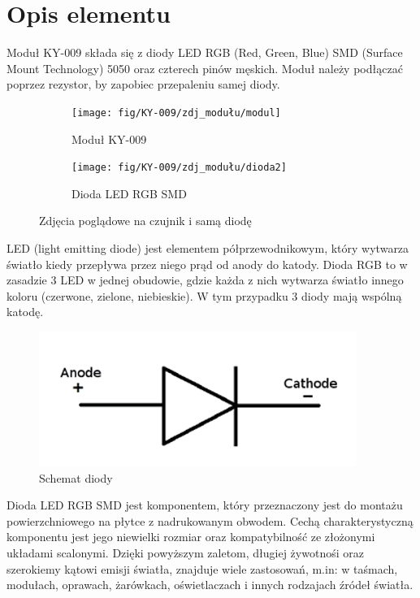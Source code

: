 \documentclass[11pt, a4paper]{article}
\author{Antoni Borowski}
\institute{Instytut Robotyki i Inteligencji Maszynowej}
\begin{document}
\newpage

\section*{Opis elementu} 
Moduł KY-009 składa się z diody LED RGB (Red, Green, Blue) SMD (Surface Mount Technology) 5050 oraz czterech pinów męskich. Moduł należy podłączać poprzez rezystor, by zapobiec przepaleniu samej diody. 

\vspace{0.5cm}
\begin{figure}[h]
\centering
\begin{subfigure}{.5\textwidth}
  \centering
  \texttt{[image: fig/KY-009/zdj\_modułu/modul]}
  \caption{Moduł KY-009 \cite{ArduinoModules:RGB}}
  \label{fig:sub1}
\end{subfigure}%
\begin{subfigure}{.5\textwidth}
  \centering
  \texttt{[image: fig/KY-009/zdj\_modułu/dioda2]}
  \caption{Dioda LED RGB SMD \cite{LED:LED}}
  \label{fig:sub2}
\end{subfigure}
\caption{Zdjęcia poglądowe na czujnik i samą diodę}
\label{fig:test}
\end{figure}
\vspace{1cm}

LED (light emitting diode) jest elementem półprzewodnikowym, który wytwarza światło kiedy przepływa przez niego prąd od anody do katody. Dioda RGB to w zasadzie 3 LED w jednej obudowie, gdzie każda z nich wytwarza światło innego koloru (czerwone, zielone, niebieskie). W tym przypadku 3 diody mają wspólną katodę.
\vspace{0.5cm}
\begin{figure}[h]
\centering
\includegraphics[width=.6\linewidth]{fig/KY-009/zasada_dzialania/LED symbol.png}
\caption{Schemat diody \cite{Wiki:Diode}}
\label{fig:sub2}

\end{figure}
\vspace{0.5cm}
\newpage
Dioda LED RGB SMD jest komponentem, który przeznaczony jest do montażu powierzchniowego na płytce z nadrukowanym obwodem. Cechą charakterystyczną komponentu jest jego niewielki rozmiar oraz kompatybilność ze złożonymi układami scalonymi. Dzięki powyższym zaletom, długiej żywotnośi oraz szerokiemy kątowi emisji światła, znajduje wiele zastosowań, m.in: w taśmach, modułach, oprawach, żarówkach, oświetlaczach i innych rodzajach źródeł światła.
\end{document}
